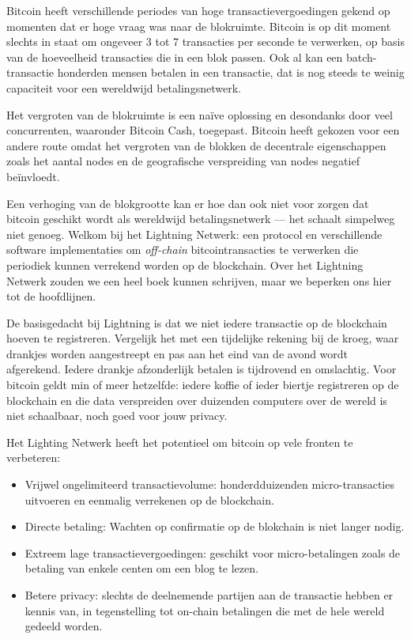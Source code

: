 Bitcoin heeft verschillende periodes van hoge transactievergoedingen gekend op momenten dat er hoge vraag was naar de blokruimte. Bitcoin is op dit moment slechts in staat om ongeveer 3 tot 7 transacties per seconde te verwerken, op basis van de hoeveelheid transacties die in een blok passen. Ook al kan een batch-transactie honderden mensen betalen in een transactie, dat is nog steeds te weinig capaciteit voor een wereldwijd betalingsnetwerk.    

Het vergroten van de blokruimte is een naïve oplossing en desondanks door veel concurrenten, waaronder Bitcoin Cash, toegepast. Bitcoin heeft gekozen voor een andere route omdat het vergroten van de blokken de decentrale eigenschappen zoals het aantal nodes en de geografische verspreiding van nodes negatief beïnvloedt. 

Een verhoging van de blokgrootte kan er hoe dan ook niet voor zorgen dat bitcoin geschikt wordt als wereldwijd betalingsnetwerk --- het schaalt simpelweg niet genoeg. Welkom bij het Lightning Netwerk: een protocol en verschillende software implementaties om \textit{off-chain} bitcointransacties te verwerken die periodiek kunnen verrekend worden op de blockchain. Over het Lightning Netwerk zouden we een heel boek kunnen schrijven, maar we beperken ons hier tot de hoofdlijnen.

De basisgedacht bij Lightning is dat we niet iedere transactie op de blockchain hoeven te registreren. Vergelijk het met een tijdelijke rekening bij de kroeg, waar drankjes worden aangestreept en pas aan het eind van de avond wordt afgerekend. Iedere drankje afzonderlijk betalen is tijdrovend en omslachtig. Voor bitcoin geldt min of meer hetzelfde: iedere koffie of ieder biertje registreren op de blockchain en die data verspreiden over duizenden computers over de wereld is niet schaalbaar, noch goed voor jouw privacy.

Het Lighting Netwerk heeft het potentieel om bitcoin op vele fronten te verbeteren:

\begin{itemize}
    \item Vrijwel ongelimiteerd transactievolume: honderdduizenden micro-transacties uitvoeren en eenmalig verrekenen op de blockchain. 
    
    \item Directe betaling: Wachten op confirmatie op de blokchain is niet langer nodig. 
    
    \item Extreem lage transactievergoedingen: geschikt voor micro-betalingen zoals de betaling van enkele centen om een blog te lezen. 
    
    \item Betere privacy: slechts de deelnemende partijen aan de transactie hebben er kennis van, in tegenstelling tot on-chain betalingen die met de hele wereld gedeeld worden.
    
\end{itemize}


